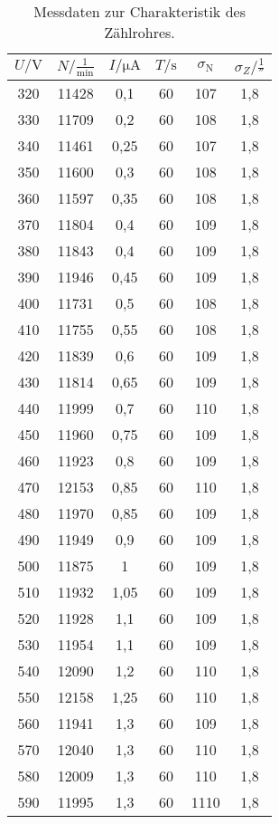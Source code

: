 \begin{table}[htpb]
	\centering
	\caption{Messdaten zur Charakteristik des Zählrohres.}
	\label{tab:plateau}
	\begin{tabular}{c c c c c c}
		\toprule
		$U / \si{\volt}$ & $N / \si{\frac{1}{\text{min}}}$ & $I / \si{\micro\ampere}$ & $T / \si{\second}$ & $\sigma_\text{N} $ & $\sigma_Z / \si{\frac{1}{\second}}$ \\
		\midrule
	     320 &	11428&	0,1	&60&	107	&1,8 \\
	     330&	11709&	0,2	&60	&108	&1,8\\
	     340&	11461&	0,25&	60&	107	&1,8\\
	     350&	11600&	0,3&	60&	108	&1,8\\
	     360&	11597&	0,35&	60&	108	&1,8\\
	     370&	11804&	0,4&	60	&109&1,8\\
	     380&	11843&	0,4	&60	&109	&1,8\\
	     390&	11946&	0,45&	60&	109 &1,8\\
	     400&	11731&	0,5	&60	&108    &1,8\\
	     410&	11755&	0,55&	60&	108  &1,8\\
	     420&	11839&	0,6	&60	&109		&1,8\\
	     430&	11814&	0,65&	60&	109	&1,8\\
	     440&	11999&	0,7	&60	&110		&1,8\\
	     450&	11960&	0,75&	60&	109	&1,8\\
	     460&	11923&	0,8	&60&	109   &1,8\\
	     470&	12153&	0,85	&60&110&1,8\\
	     480&	11970&	0,85	&60&109&1,8\\
	     490&	11949&	0,9&	60	&109&1,8\\
	     500&	11875&	1&	60	&109&1,8\\
	     510&	11932&	1,05&	60&	109&1,8\\
	     520&	11928&	1,1	&60	&109&1,8\\
	     530&	11954&	1,1	&60	&109&1,8\\
	     540&	12090&	1,2	&60	&110&1,8\\
	     550&	12158&	1,25&	60&	110&1,8\\
	     560&	11941&	1,3	&60	&109&1,8\\
	     570&	12040&	1,3&	60	&110&1,8\\
	     580&	12009&	1,3	&60	&110&1,8\\
	     590&	11995&	1,3	&60	&1110&1,8\\

\end{tabular}
\end{table}
